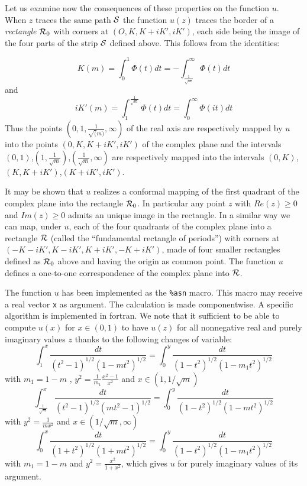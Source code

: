 Let us examine now the consequences of these properties on the function $u$.
When $z$ traces the  same path ${\cal S}$ the function $u(z)$ traces the border of a {\em rectangle} ${\cal R}_0$ with corners at $(O,K,K+iK',iK')$, each side being the image of the four parts of the strip ${\cal S}$ defined above.
This follows from the identities:

$$K(m)=\int_{0}^{1}{\Phi(t)dt}=-\int_{\frac{1}{\sqrt{m}}}^{\infty}{\Phi(t)dt}$$ and
$$iK'(m)=\int_{1}^{\frac{1}{\sqrt{m}}}{\Phi(t)dt}=\int_{0}^{\infty}{\Phi(it)dt}$$
Thus the points $(0,1,\frac{1}{\sqrt(m)},\infty)$ of the real axis are respectively mapped by $u$ into the points $(0,K,K+iK',iK')$ of the complex plane and the intervals $(0,1)$,$(1,\frac{1}{\sqrt{m}})$,$(\frac{1}{\sqrt{m}},\infty)$ are respectively mapped into the intervals $(0,K)$,$(K,K+iK')$,$(K+iK',iK')$.

It may be shown that $u$ realizes a conformal mapping of the first quadrant of the complex plane into the rectangle ${\cal R}_0$.
In particular any point $z$ with $Re(z) \geq 0$ and $Im(z) \geq 0$ admits an unique image in the rectangle.
In a similar way we can map, under  $u$, each of the four quadrants of the complex plane into a rectangle ${\cal R}$ (called the ``fundamental rectangle of periods'') with corners at
$(-K-iK',K-iK',K+iK',-K+iK')$, made of four smaller rectangles defined as ${\cal R}_0$ above and having the origin as common point.
The function $u$ defines a one-to-one correspondence of the complex plane into ${\cal R}$.

The function $u$ has been implemented as the {\tt \%asn} macro.  This macro may receive a real vector {\tt x} as argument.  The calculation is made componentwise.  A specific algorithm \cite{Carlson} is implemented in fortran.
We note that it sufficient to be able to compute $u(x)$ for $x \in (0,1)$ to have $u(z)$ for all nonnegative real and purely imaginary values $z$ thanks to the following changes of variable:
$$
\int_{1}^{x}{\frac{dt}{{(t^2-1)}^{1/2}{(1-m t^2)}^{1/2}}} = \int_{0}^{y}{\frac{dt}{{(1-t^2)}^{1/2}{(1-m_{1} t^2)}^{1/2}}}
$$
with $m_1=1-m$ , $y^2 = \frac{1}{m_1} \frac{x^2-1}{x^2}$ and $x \in (1,1/\sqrt{m})$
$$
\int_{\frac{1}{\sqrt{m}}}^{x}{\frac{dt}{{(t^2-1)}^{1/2}{(m t^2-1)}^{1/2}}} = \int_{0}^{y}{\frac{dt}{{(1-t^2)}^{1/2}{(1-m t^2)}^{1/2}}}
$$
with $y^2 = \frac{1}{m x^2}$ and $ x \in (1/\sqrt{m},\infty)$
$$
\int_{0}^{x}{\frac{dt}{{(1+t^2)}^{1/2}{(1+m t^2)}^{1/2}}} = \int_{0}^{y}{\frac{dt}{{(1-t^2)}^{1/2}{(1-m_{1} t^2)}^{1/2}}}
$$
with $m_1 = 1-m$ and $y^2 = \frac{x^2}{1 + x^2}$, which gives $u$ for purely imaginary values of its argument.

